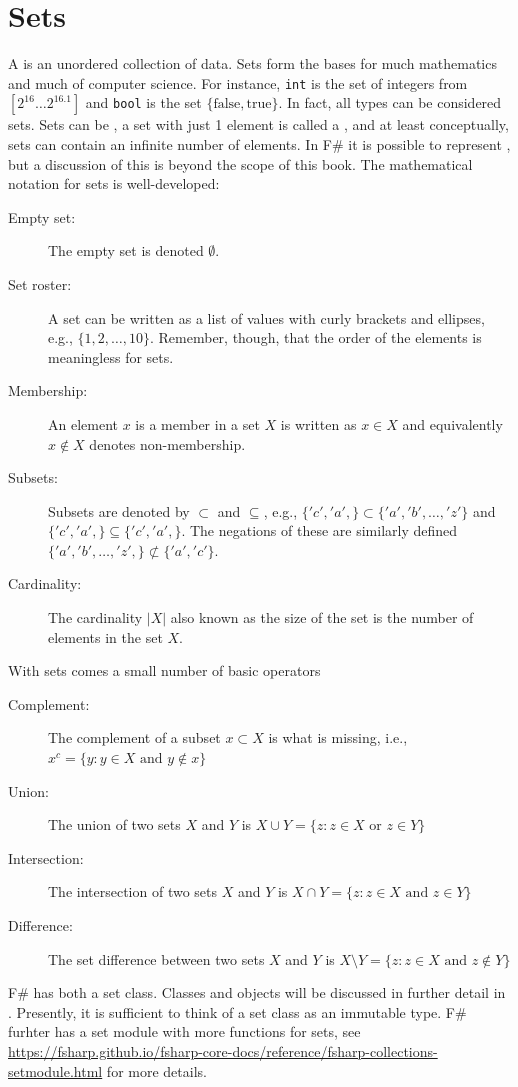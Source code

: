 \documentclass[fsharpNotes.tex]{subfiles}
\begin{document}
\section{Sets}
A  is an unordered collection of data. Sets form the bases for much mathematics and much of computer science. For instance, \lstinline{int} is the set of integers from $[2^16\ldots 2^16.1]$ and \lstinline{bool} is the set $\{\text{false}, \text{true}\}$. In fact, all types can be considered sets. Sets can be , a set with just 1 element is called a , and at least conceptually, sets can contain an infinite number of elements. In F\# it is possible to represent , but a discussion of this is beyond the scope of this book. The mathematical notation for sets is well-developed:
\begin{description}
\item[Empty set:] The empty set is denoted $\emptyset$.
\item[Set roster:] A set can be written as a list of values with curly brackets and ellipses, e.g., $\{1,2,\ldots,10\}$. Remember, though, that the order of the elements is meaningless for sets.
\item[Membership:] An element $x$ is a member in a set $X$ is written as $x\in X$ and equivalently $x\not\in X$ denotes non-membership.
\item[Subsets:] Subsets are denoted by $\subset$ and $\subseteq$, e.g., $\{'c','a',\}\subset\{'a','b',\ldots,'z'\}$ and $\{'c','a',\}\subseteq \{'c','a',\}$. The negations of these are similarly defined $\{'a','b',\ldots,'z',\}\not\subset\{'a','c'\}$.
\item[Cardinality:] The cardinality $|X|$ also known as the size of the set is the number of elements in the set $X$.
\end{description}
With sets comes a small number of basic operators
\begin{description}
\item[Complement:] The complement of a subset $x\subset X$ is what is missing, i.e., $x^c=\{y: y\in X \text{ and } y\not\in x\}$
\item[Union:] The union of two sets $X$ and $Y$ is $X\cup Y = \{z: z\in X \text{ or } z\in Y\}$  
\item[Intersection:] The intersection of two sets $X$ and $Y$ is $X\cap Y = \{z: z\in X \text{ and } z\in Y\}$
\item[Difference:] The set difference between two sets $X$ and $Y$ is $X\setminus Y = \{z: z\in X \text{ and } z\not\in Y\}$
\end{description} 
F\# has both a set class. Classes and objects will be discussed in further detail in . Presently, it is sufficient to think of a set class as an immutable type. F\# furhter has a set module with more functions for sets, see \url{https://fsharp.github.io/fsharp-core-docs/reference/fsharp-collections-setmodule.html} for more details.
\end{document}
